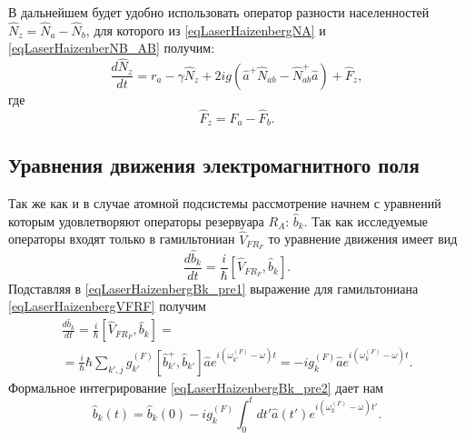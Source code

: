 В дальнейшем будет удобно использовать оператор разности населенностей
$\hat{N}_z = \hat{N}_a - \hat{N}_b$, для которого из
\eqref{eqLaserHaizenbergNA} и 
\eqref{eqLaserHaizenberNB_AB} получим:
\begin{equation}
\frac{d \hat{N}_z}{d t} = r_a
- \gamma \hat{N}_{z} +
2 i g 
 \left(
\hat{a}^{+}\hat{N}_{ab} -
\hat{N}_{ab}^{+}\hat{a}
\right) + \hat{F}_{z},
\label{eqLaserHaizenberNZ}
\end{equation}
где
\begin{equation}
\hat{F}_{z} = \hat{F}_{a} - \hat{F}_{b}.
\label{eqLaserHaizenberFZ}
\end{equation}

\subsection{Уравнения движения электромагнитного поля}

Так же как и в случае атомной подсистемы рассмотрение начнем с
уравнений которым удовлетворяют операторы резервуара $R_A$:
$\hat{b}_k$. Так как исследуемые операторы входят только в
гамильтониан $\hat{V}_{FR_F}$ то уравнение движения имеет вид
\begin{equation}
\frac{d \hat{b}_k}{d t} = \frac{i}{\hbar}\left[\hat{V}_{FR_F}, \hat{b}_k
\right].
\label{eqLaserHaizenbergBk_pre1}
\end{equation}
Подставляя в \eqref{eqLaserHaizenbergBk_pre1} выражение для
гамильтониана \eqref{eqLaserHaizenbergVFRF} получим
\begin{eqnarray}
\frac{d \hat{b}_k}{d t} = \frac{i}{\hbar}\left[\hat{V}_{FR_F}, \hat{b}_k
\right] = 
\nonumber \\
= \frac{i}{\hbar} \hbar 
\sum_{k',j} 
g_{k'}^{(F)}\left[\hat{b}_{k'}^{+},
  \hat{b}_{k'}\right]\hat{a}e^{i\left(\omega_{k'}^{(F)} - \omega\right)t} = 
-i g_{k}^{(F)}\hat{a}e^{i\left(\omega_{k}^{(F)} - \omega\right)t}.
\label{eqLaserHaizenbergBk_pre2}
\end{eqnarray}
Формальное интегрирование \eqref{eqLaserHaizenbergBk_pre2} дает нам
\begin{equation}
\hat{b}_k\left(t\right) = 
\hat{b}_k\left(0\right) 
-i g_{k}^{(F)}\int_0^t d
t'\hat{a}\left(t'\right)e^{i\left(\omega_{k}^{(F)} - \omega\right)t'}.
\label{eqLaserHaizenbergBk}
\end{equation}

